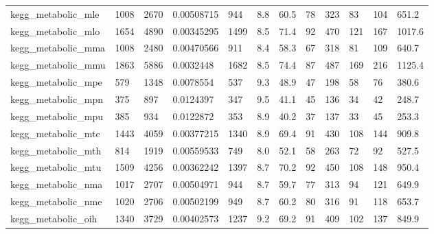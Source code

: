 \begin{longtable}{llllllllllll}
 kegg\_metabolic\_mle                                 & 1008       & 2670      & 0.00508715  & 944   & 8.8    & 60.5   & 78    & 323    & 83     & 104    & 651.2   \\
 kegg\_metabolic\_mlo                                 & 1654       & 4890      & 0.00345295  & 1499  & 8.5    & 71.4   & 92    & 470    & 121    & 167    & 1017.6  \\
 kegg\_metabolic\_mma                                 & 1008       & 2480      & 0.00470566  & 911   & 8.4    & 58.3   & 67    & 318    & 81     & 109    & 640.7   \\
 kegg\_metabolic\_mmu                                 & 1863       & 5886      & 0.0032448   & 1682  & 8.5    & 74.4   & 87    & 487    & 169    & 216    & 1125.4  \\
 kegg\_metabolic\_mpe                                 & 579        & 1348      & 0.0078554   & 537   & 9.3    & 48.9   & 47    & 198    & 58     & 76     & 380.6   \\
 kegg\_metabolic\_mpn                                 & 375        & 897       & 0.0124397   & 347   & 9.5    & 41.1   & 45    & 136    & 34     & 42     & 248.7   \\
 kegg\_metabolic\_mpu                                 & 385        & 934       & 0.0122872   & 353   & 8.9    & 40.2   & 37    & 137    & 33     & 45     & 253.3   \\
 kegg\_metabolic\_mtc                                 & 1443       & 4059      & 0.00377215  & 1340  & 8.9    & 69.4   & 91    & 430    & 108    & 144    & 909.8   \\
 kegg\_metabolic\_mth                                 & 814        & 1919      & 0.00559533  & 749   & 8.0    & 52.1   & 58    & 263    & 72     & 92     & 527.5   \\
 kegg\_metabolic\_mtu                                 & 1509       & 4256      & 0.00362242  & 1397  & 8.7    & 70.2   & 92    & 450    & 108    & 148    & 950.4   \\
 kegg\_metabolic\_nma                                 & 1017       & 2707      & 0.00504971  & 944   & 8.7    & 59.7   & 77    & 313    & 94     & 121    & 649.9   \\
 kegg\_metabolic\_nme                                 & 1020       & 2706      & 0.00502199  & 949   & 8.7    & 60.2   & 80    & 316    & 91     & 118    & 653.7   \\
 kegg\_metabolic\_oih                                 & 1340       & 3729      & 0.00402573  & 1237  & 9.2    & 69.2   & 91    & 409    & 102    & 137    & 849.9   \\

\end{longtable}
